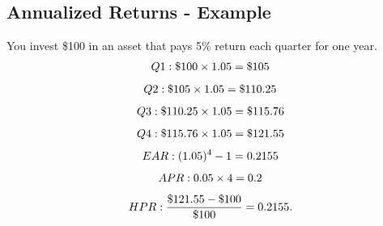 \documentclass[letterpaper,10pt,english]{sphinxmanual}
\begin{document}
\subsection{Annualized Returns - Example}
\label{returns:annualized-returns-example}
You invest \$100 in an asset that pays 5\% return each quarter for
one year.
\begin{gather}
\begin{split}Q1: \$100 \times 1.05 = \$105\end{split}\notag
\end{gather}\begin{gather}
\begin{split}Q2: \$105 \times 1.05 = \$110.25\end{split}\notag
\end{gather}\begin{gather}
\begin{split}Q3: \$110.25 \times 1.05 = \$115.76\end{split}\notag
\end{gather}\begin{gather}
\begin{split}Q4: \$115.76 \times 1.05 = \$121.55\end{split}\notag
\end{gather}\begin{gather}
\begin{split}EAR: (1.05)^4 - 1 = 0.2155\end{split}\notag
\end{gather}\begin{gather}
\begin{split}APR: 0.05 \times 4 = 0.2\end{split}\notag
\end{gather}\begin{gather}
\begin{split}HPR: \frac{\$121.55 - \$100}{\$100} = 0.2155.\end{split}\notag
\end{gather}
\end{document}
